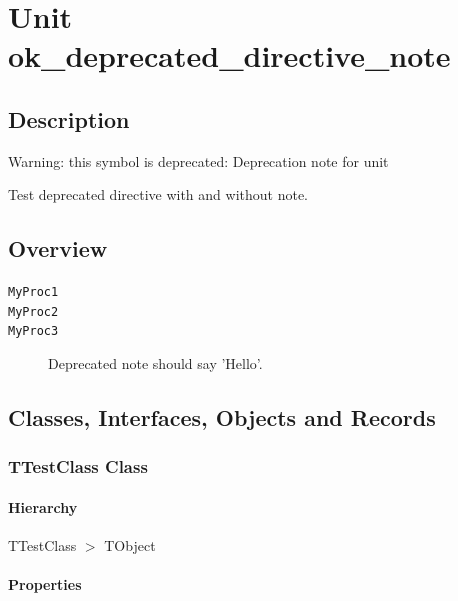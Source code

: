 \documentclass{report}
\begin{document}
\newlength{\tmplength}
\chapter{Unit ok{\_}deprecated{\_}directive{\_}note}
\section{Description}
Warning: this symbol is deprecated: Deprecation note for unit

Test deprecated directive with and without note.
\section{Overview}
\begin{description}
\item[\texttt{\begin{ttfamily}TTestClass\end{ttfamily} Class}]
\item[\texttt{\begin{ttfamily}TTestClassDeprecated1\end{ttfamily} Class}]
\item[\texttt{\begin{ttfamily}TTestClassDeprecated2\end{ttfamily} Class}]
\end{description}
\begin{description}
\item[\texttt{MyProc1}]
\item[\texttt{MyProc2}]
\item[\texttt{MyProc3}]Deprecated note should say 'Hello'.
\end{description}
\section{Classes, Interfaces, Objects and Records}
\subsection*{TTestClass Class}
\subsubsection*{\large{\textbf{Hierarchy}}\normalsize\hspace{1ex}\hfill}
TTestClass {$>$} TObject
\subsubsection*{\large{\textbf{Properties}}\normalsize\hspace{1ex}\hfill}
\end{document}
